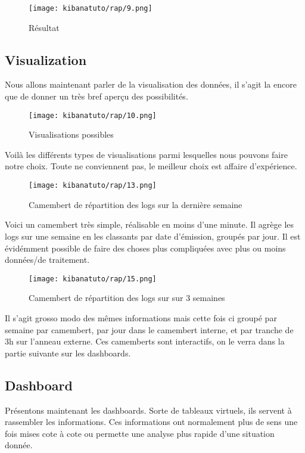 \begin{figure}[H]
\center
\texttt{[image: kibanatuto/rap/9.png]}
\label{fig:kibanatuto6}
\caption{Résultat}
\end{figure}

\subsection{Visualization}
Nous allons maintenant parler de la visualisation des données, il s'agit la encore
que de donner un très bref aperçu des possibilités.

\begin{figure}[H]
\center
\texttt{[image: kibanatuto/rap/10.png]}
\label{fig:kibanatuto7}
\caption{Visualisations possibles}
\end{figure}
Voilà les différents types de visualisations parmi lesquelles nous pouvons faire 
notre choix. Toute ne conviennent pas, le meilleur choix est affaire d'expérience.


\begin{figure}[H]
\center
\texttt{[image: kibanatuto/rap/13.png]}
\label{fig:kibanatuto8}
\caption{Camembert de répartition des logs sur la dernière semaine}
\end{figure}
Voici un camembert très simple, réalisable en moins d'une minute. Il agrège les logs
sur une semaine en les classants par date d'émission, groupés par jour. 
Il est évidémment possible de faire des choses plus compliquées avec plus ou moins
données/de traitement.


\begin{figure}[H]
\center
\texttt{[image: kibanatuto/rap/15.png]}
\label{fig:kibanatuto9}
\caption{Camembert de répartition des logs sur sur 3 semaines}
\end{figure}
Il s'agit grosso modo des mêmes informations mais cette fois ci groupé par semaine
par camembert, par jour dans le camembert interne, et par tranche de 3h sur l'anneau
externe. Ces camemberts sont interactifs, on le verra dans la partie suivante sur 
les dashboards.


\subsection{Dashboard}
Présentons maintenant les dashboards. Sorte de tableaux virtuels, ils servent à rassembler
les informations. Ces informations ont normalement plus de sens une fois mises cote 
à cote ou permette une analyse plus rapide d'une situation donnée.

